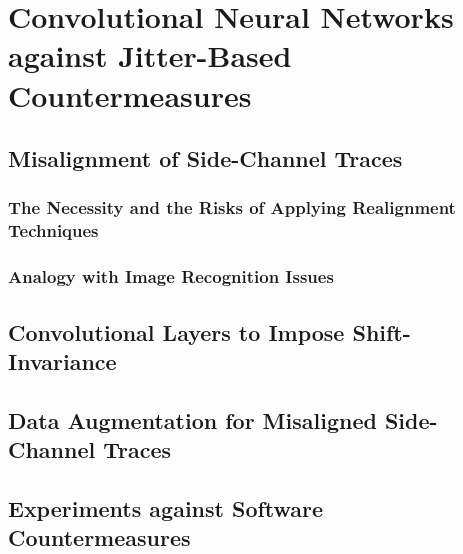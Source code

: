 
\chapter{Convolutional Neural Networks against Jitter-Based Countermeasures} %

\label{ChapterCNN}


\section{Misalignment of Side-Channel Traces}

\subsection{The Necessity and the Risks of Applying Realignment Techniques}
\subsection{Analogy with Image Recognition Issues}


\section{Convolutional Layers to Impose Shift-Invariance}


\section{Data Augmentation for Misaligned Side-Channel Traces}

\section{Experiments against Software Countermeasures}


